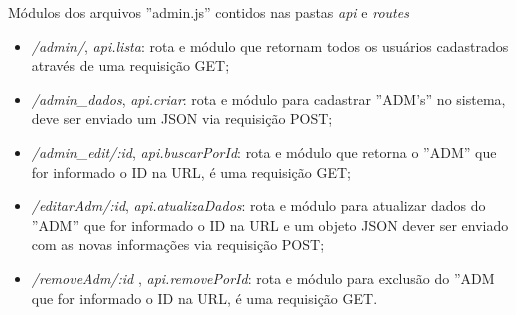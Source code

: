 \par
Módulos dos arquivos ''admin.js'' contidos nas pastas \textit{api} e \textit{routes}
\begin{itemize}
    \item \textit{/admin/}, \textit{api.lista}:  rota e módulo que retornam todos os usuários cadastrados através de uma requisição GET;

    \item \textit{/admin\_dados}, \textit{api.criar}: rota e módulo para cadastrar ''ADM's'' no sistema, deve ser enviado um JSON via requisição POST;
    
    \item \textit{/admin\_edit/:id}, \textit{api.buscarPorId}: rota e módulo que retorna o ''ADM'' que for informado o ID na URL, é uma requisição GET;
    
    \item \textit{/editarAdm/:id}, \textit{api.atualizaDados}: rota e módulo para atualizar dados do ''ADM'' que for informado o ID na URL e um objeto JSON dever ser enviado com as novas informações via requisição POST;
    
    \item \textit{/removeAdm/:id} , \textit{api.removePorId}: rota e módulo para exclusão do ''ADM que for informado o ID na URL, é uma requisição GET.
\end{itemize}

